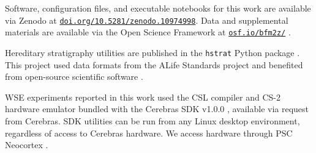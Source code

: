 Software, configuration files, and executable notebooks for this work are available via Zenodo at \href{https://doi.org/10.5281/zenodo.10974998}{\texttt{doi.org/10.5281/zenodo.10974998}}.
Data and supplemental materials are available via the Open Science Framework at \href{https://osf.io/bfm2z/}{\texttt{osf.io/bfm2z/}} \citep{foster2017open}.

Hereditary stratigraphy utilities are published in the \texttt{hstrat} Python package \citep{moreno2022hstrat}.
This project used data formats from the ALife Standards project \citep{lalejini2019data} and benefited from open-source scientific software \citep{huerta2016ete,2020SciPy-NMeth,harris2020array,reback2020pandas,mckinney-proc-scipy-2010,cock2009biopython,waskom2021seaborn,hunter2007matplotlib,moreno2024apc,moreno2024pecking,moreno2024hsurf,moreno2024wse,dolson2024phylotrackpy}.

WSE experiments reported in this work used the CSL compiler and CS-2 hardware emulator bundled with the Cerebras SDK v1.0.0 \citep{selig2022cerebras}, available via request from Cerebras.
SDK utilities can be run from any Linux desktop environment, regardless of access to Cerebras hardware.
We access hardware through PSC Neocortex \citep{buitrago2021neocortex}.
